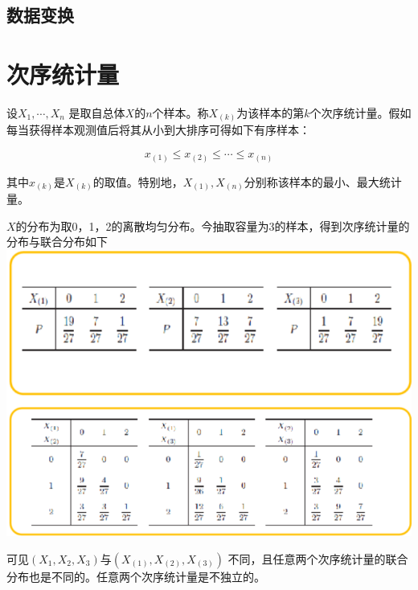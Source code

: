 \documentclass[UTF-8]{ctexbeamer}
\begin{document}
\subsection{数据变换}

\section{次序统计量}
\begin{frame}
  \begin{Def}
    设$X_1,\cdots, X_n$ 是取自总体$X$的$n$个样本。称$X_{(k)}$为该样本的第$k$个次序统计量。假如每当获得样本观测值后将其从小到大排序可得如下有序样本：

$$
x_{(1)}\leq x_{(2)}\leq\cdots\leq x_{(n)}
$$

其中$x_{(k)}$是$X_{(k)}$的取值。特别地，$X_{(1)},X_{(n)}$分别称该样本的最小、最大统计量。
  \end{Def}
\end{frame}

\begin{frame}
  \begin{Eg}
    $X$的分布为取0，1，2的离散均匀分布。今抽取容量为3的样本，得到次序统计量的分布与联合分布如下
    \includegraphics[scale=0.4]{joint.png}
    
    可见$(X_1,X_2,X_3)$与$(X_{(1)},X_{(2)},X_{(3)})$ 不同，且任意两个次序统计量的联合分布也是不同的。任意两个次序统计量是不独立的。
  \end{Eg}
  
\end{frame}
\end{document}

